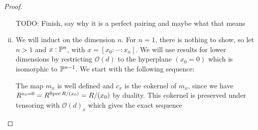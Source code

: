 \begin{proof}
\begin{enumerate}[(i)]
    TODO: Finish, say why it is a perfect pairing and maybe what that means
  \item We will induct on the dimension $n$.
    For $n=1$, there is nothing to show, so let $n>1$ and $x:\mathbb{P}^n$, with $x=[x_0:\cdots:x_n]$.
    We will use results for lower dimensions by restricting $\mathcal O(d)$ to the hyperplane $(x_0=0)$ which is isomorphic to $\mathbb{P}^{n-1}$.
    We start with the following sequence:
    \begin{center}
    \end{center}
    The map $m_x$ is well defined and $c_x$ is the cokernel of $m_x$, since we have $R^{x_0=0}=R^{\operatorname{Spec} R/(x_0)}=R/(x_0)$ by duality.
    This cokernel is preserved under tensoring with $\mathcal O(d)_x$ which gives the exact sequence
    \begin{center}
    \end{center}
    

\end{enumerate}
\end{proof}
